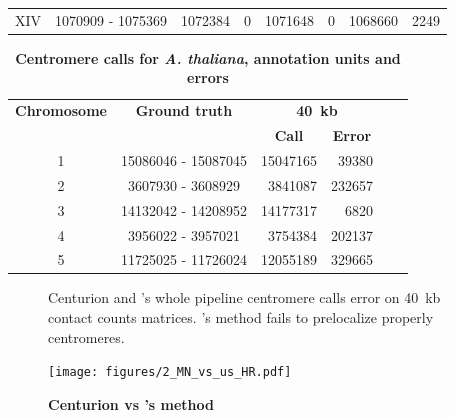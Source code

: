 \begin{table}[ht!]
\begin{center}
\begin{tabular}{c | c  r  r  r  r r r}
XIV & \num[group-separator={\,}]{1070909} - \num[group-separator={\,}]{1075369} & \num[group-separator={\,}]{1072384} & \small{\num[group-separator={\,}]{0}}  & \num[group-separator={\,}]{1071648} & \small{\num[group-separator={\,}]{0}}  & \num[group-separator={\,}]{1068660} & \small{\num[group-separator={\,}]{2249}}  \\
\end{tabular}
\end{center}
\label{supptable:schizonts_results}
\end{table}

\clearpage

\begin{table}[ht!]
\caption{\textbf{Centromere calls for \textit{A. thaliana},
annotation units and errors}}
\begin{center}
\begin{tabular}{c | c  r  r  r  r}
\textbf{Chromosome}  & \textbf{Ground truth} & \multicolumn{2}{c}{\textbf{40~kb}} \\
  &   &  \multicolumn{1}{c}{\textbf{Call}} &  \multicolumn{1}{c}{\textbf{Error}} \\
\hline
1 & \num[group-separator={\,}]{15086046} - \num[group-separator={\,}]{15087045} &
  \num[group-separator={\,}]{15047165} &
  \small{\num[group-separator={\,}]{39380}}  \\
2 & \num[group-separator={\,}]{3607930} - \num[group-separator={\,}]{3608929} &
    \num[group-separator={\,}]{3841087} &
\small{\num[group-separator={\,}]{232657}}   \\
3 & \num[group-separator={\,}]{14132042} - \num[group-separator={\,}]{14208952} &
  \num[group-separator={\,}]{14177317} &
  \small{\num[group-separator={\,}]{6820}} \\
4 & \num[group-separator={\,}]{3956022} - \num[group-separator={\,}]{3957021} &
  \num[group-separator={\,}]{3754384} &
  \small{\num[group-separator={\,}]{202137}}  \\
5 & \num[group-separator={\,}]{11725025} - \num[group-separator={\,}]{11726024} &
  \num[group-separator={\,}]{12055189} &
  \small{\num[group-separator={\,}]{329665}}  \\
\end{tabular}
\end{center}
\end{table}

\clearpage

\begin{figure}[ht!]
\caption{\textbf{Centurion vs \citet{marie-nelly:filling}'s method}}
Centurion and \citet{marie-nelly:filling}'s whole pipeline centromere calls
error on 40~kb contact counts matrices. \citet{marie-nelly:filling}'s method
fails to prelocalize properly centromeres.
\begin{center}
\texttt{[image: figures/2\_MN\_vs\_us\_HR.pdf]}
\end{center}
\label{suppfig:marie_nelly_vs_us_HR}
\end{figure}

